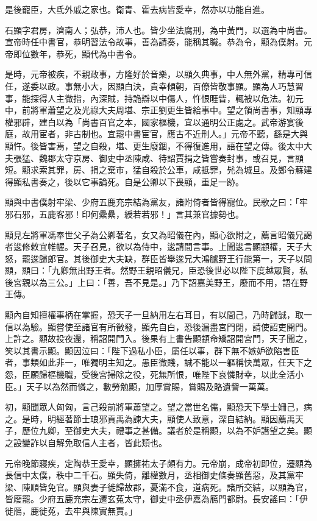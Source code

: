 \begin{pinyinscope}
是後寵臣，大氐外戚之家也。衛青、霍去病皆愛幸，然亦以功能自進。

石顯字君房，濟南人；弘恭，沛人也。皆少坐法腐刑，為中黃門，以選為中尚書。宣帝時任中書官，恭明習法令故事，善為請奏，能稱其職。恭為令，顯為僕射。元帝即位數年，恭死，顯代為中書令。

是時，元帝被疾，不親政事，方隆好於音樂，以顯久典事，中人無外黨，精專可信任，遂委以政。事無小大，因顯白決，貴幸傾朝，百僚皆敬事顯。顯為人巧慧習事，能探得人主微指，內深賊，持詭辯以中傷人，忤恨睚眥，輒被以危法。初元中，前將軍蕭望之及光祿大夫周堪、宗正劉更生皆給事中。望之領尚書事，知顯專權邪辟，建白以為「尚書百官之本，國家樞機，宜以通明公正處之。武帝游宴後庭，故用宦者，非古制也。宜罷中書宦官，應古不近刑人。」元帝不聽，繇是大與顯忤。後皆害焉，望之自殺，堪、更生廢錮，不得復進用，語在望之傳。後太中大夫張猛、魏郡太守京房、御史中丞陳咸、待詔賈捐之皆嘗奏封事，或召見，言顯短。顯求索其罪，房、捐之棄市，猛自殺於公車，咸抵罪，髡為城旦。及鄭令蘇建得顯私書奏之，後以它事論死。自是公卿以下畏顯，重足一跡。

顯與中書僕射牢梁、少府五鹿充宗結為黨友，諸附倚者皆得寵位。民歌之曰：「牢邪石邪，五鹿客邪！印何纍纍，綬若若邪！」言其兼官據勢也。

顯見左將軍馮奉世父子為公卿著名，女又為昭儀在內，顯心欲附之，薦言昭儀兄謁者逡修敕宜帷幄。天子召見，欲以為侍中，逡請間言事。上聞逡言顯顓權，天子大怒，罷逡歸郎官。其後御史大夫缺，群臣皆舉逡兄大鴻臚野王行能第一，天子以問顯，顯曰：「九卿無出野王者。然野王親昭儀兄，臣恐後世必以陛下度越眾賢，私後宮親以為三公。」上曰：「善，吾不見是。」乃下詔嘉美野王，廢而不用，語在野王傳。

顯內自知擅權事柄在掌握，恐天子一旦納用左右耳目，有以間己，乃時歸誠，取一信以為驗。顯嘗使至諸官有所徵發，顯先自白，恐後漏盡宮門閉，請使詔吏開門。上許之。顯故投夜還，稱詔開門入。後果有上書告顯顓命矯詔開宮門，天子聞之，笑以其書示顯。顯因泣曰：「陛下過私小臣，屬任以事，群下無不嫉妒欲陷害臣者，事類如此非一，唯獨明主知之。愚臣微賤，誠不能以一軀稱快萬眾，任天下之怨，臣願歸樞機職，受後宮掃除之役，死無所恨，唯陛下哀憐財幸，以此全活小臣。」天子以為然而憐之，數勞勉顯，加厚賞賜，賞賜及賂遺訾一萬萬。

初，顯聞眾人匈匈，言己殺前將軍蕭望之。望之當世名儒，顯恐天下學士姍己，病之。是時，明經著節士琅邪貢禹為諫大夫，顯使人致意，深自結納。顯因薦禹天子，歷位九卿，至御史大夫，禮事之甚備。議者於是稱顯，以為不妒譖望之矣。顯之設變詐以自解免取信人主者，皆此類也。

元帝晚節寢疾，定陶恭王愛幸，顯擁祐太子頗有力。元帝崩，成帝初即位，遷顯為長信中太僕，秩中二千石。顯失倚，離權數月，丞相御史條奏顯舊惡，及其黨牢梁、陳順皆免官。顯與妻子徙歸故郡，憂滿不食，道病死。諸所交結，以顯為官，皆廢罷。少府五鹿充宗左遷玄菟太守，御史中丞伊嘉為鴈門都尉。長安謠曰：「伊徙鴈，鹿徙菟，去牢與陳實無賈。」


\end{pinyinscope}
